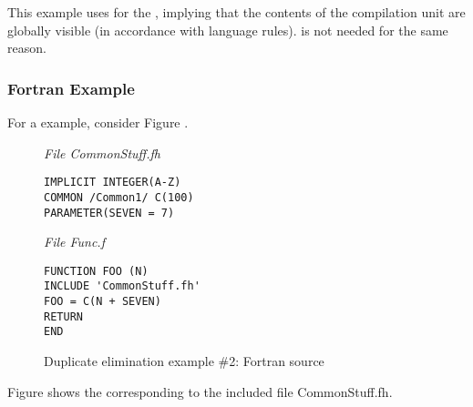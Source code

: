 This example uses  for the ,
implying that the contents of the compilation unit are
globally visible (in accordance with 
 language rules).
 is not needed for the same reason.

\subsubsection{Fortran Example}


For a 
example, consider 
Figure .

\begin{figure}
\textit{File CommonStuff.fh}
\begin{lstlisting}[numbers=none]
IMPLICIT INTEGER(A-Z)
COMMON /Common1/ C(100)
PARAMETER(SEVEN = 7)
\end{lstlisting}

\textit{File Func.f}
\begin{lstlisting}[numbers=none]
FUNCTION FOO (N)
INCLUDE 'CommonStuff.fh'
FOO = C(N + SEVEN)
RETURN
END
\end{lstlisting}
\caption{Duplicate elimination example \#2: Fortran source} 
\label{fig:duplicateeliminationexample2fortransource}
\end{figure}


Figure 
shows the 
corresponding to the included file 
CommonStuff.fh.

